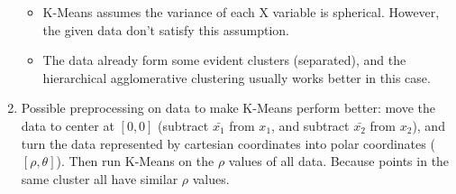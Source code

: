 \documentclass[paper=letter, fontsize=12pt]{article}
\begin{document}
\begin{enumerate}[label=(\alph*)]
	\begin{itemize}
		\item K-Means assumes the variance of each X variable is spherical. However, the given data don't satisfy this assumption.
		
		\item The data already form some evident clusters (separated), and the hierarchical agglomerative clustering usually works better in this case.
	\end{itemize}
	
	\item Possible preprocessing on data to make K-Means perform better: move the data to center at $[0, 0]$ (subtract $\bar{x_1}$ from $x_1$, and subtract $\bar{x_2}$ from $x_2$), and turn the data represented by cartesian coordinates into polar coordinates ($[\rho, \theta]$). Then run K-Means on the $\rho$ values of all data. Because points in the same cluster all have similar $\rho$ values. 
	
\end{enumerate}
\end{document}
